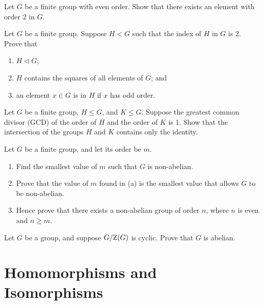 \begin{problem}
    Let $G$ be a finite group with even order. Show that there exists an element with order 2 in $G$.
\end{problem}

\begin{problem}\label{problem-subgroup-of-index-2}
    Let $G$ be a finite group. Suppose $H < G$ such that the index of $H$ in $G$ is 2. Prove that
    \begin{enumerate}[label=(\roman*)]
        \item $H \lhd G$;
        \item $H$ contains the squares of all elements of $G$; and
        \item an element $x \in G$ is in $H$ if $x$ has odd order.
    \end{enumerate}
\end{problem}

\begin{problem}\label{problem-intersection-of-coprime-subgroups}
    Let $G$ be a finite group, $H \leq G$, and $K \leq G$. Suppose the greatest common divisor (GCD) of the order of $H$ and the order of $K$ is 1. Show that the intersection of the groups $H$ and $K$ contains only the identity.
\end{problem}

\begin{problem}\label{problem-smallest-nonabelian-group}
    Let $G$ be a finite group, and let its order be $m$.
    \begin{enumerate}[label=(\alph*)]
        \item Find the smallest value of $m$ such that $G$ is non-abelian.
        \item Prove that the value of $m$ found in (a) is the smallest value that allows $G$ to be non-abelian.
        \item Hence prove that there exists a non-abelian group of order $n$, where $n$ is even and $n \geq m$.
    \end{enumerate}
\end{problem}

\begin{problem}\label{problem-quotient-of-group-mod-center-is-cyclic-implies-abelian}
    Let $G$ be a group, and suppose $G / \mathrm{Z}(G)$ is cyclic. Prove that $G$ is abelian.
\end{problem}

\chapter{Homomorphisms and Isomorphisms}
